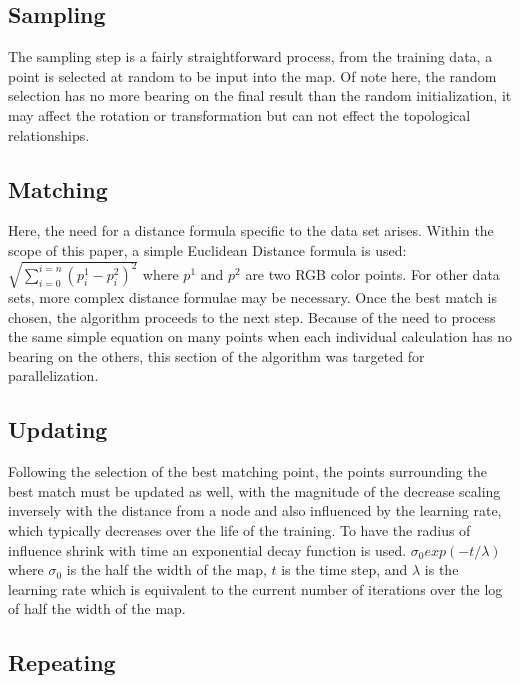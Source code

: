 \documentclass[11pt]{article}
\begin{document}
\subsection{Sampling}

The sampling step is a fairly straightforward process, from the training data, a point is selected at random to be input into the map. Of note here, the random selection has no more bearing on the final result than the random initialization, it may affect the rotation or transformation but can not effect the topological relationships.

\subsection{Matching}

Here, the need for a distance formula specific to the data set arises. Within the scope of this paper, a simple Euclidean Distance formula is used: \begin{math}\sqrt{\sum\limits_{i=0}^{i=n} ({p^1_i}-{p^2_i})^2} \end{math}  where \(p^1\) and \(p^2\) are two RGB color points. For other data sets, more complex distance formulae may be necessary. Once the best match is chosen, the algorithm proceeds to the next step. Because of the need to process the same simple equation on many points when each individual calculation has no bearing on the others, this section of the algorithm was targeted for parallelization.

\subsection{Updating}

Following the selection of the best matching point, the points surrounding the best match must be updated as well, with the magnitude of the decrease scaling inversely with the distance from a node and also influenced by the learning rate, which typically decreases over the life of the training. To have the radius of influence shrink with time an exponential decay function is used. \begin{math}\sigma_0exp(-t/\lambda) \end{math} where \(\sigma_0\) is the half the width of the map, \(t\) is the time step, and \(\lambda\) is the learning rate which is equivalent to the current number of iterations over the log of half the width of the map. 

\subsection{Repeating}
\end{document}
